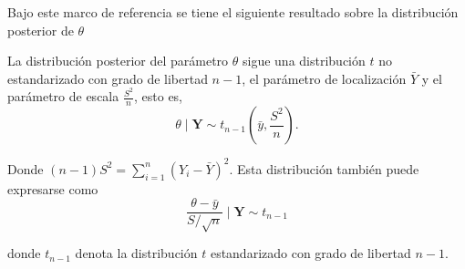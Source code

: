 Bajo este marco de referencia se tiene el siguiente resultado sobre la distribución posterior de $\theta$
\begin{Res}\label{pos_theta_no_informativa}
La distribución posterior del parámetro $\theta$ sigue una distribución $t$ no estandarizado con grado de libertad $n-1$, el parámetro de localización $\bar{Y}$ y el parámetro de escala $\frac{S^2}{n}$, esto es, 
\begin{equation*}
\theta \mid \mathbf{Y}\sim t_{n-1}\left(\bar{y},\frac{S^2}{n}\right).
\end{equation*}

Donde $(n-1)S^2=\sum_{i=1}^n(Y_i-\bar{Y})^2$. Esta distribución también puede expresarse como
\begin{equation*}
\frac{\theta-\bar{y}}{S/\sqrt{n}} \mid \mathbf{Y} \sim t_{n-1}
\end{equation*}

donde $t_{n-1}$ denota la distribución $t$ estandarizado con grado de libertad $n-1$.
\end{Res}


